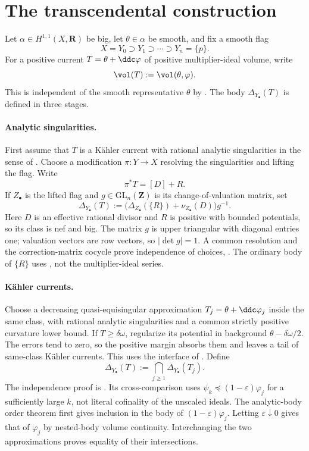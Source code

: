 \section{The transcendental construction}
\label{sec:ok-transcendental-body}

Let $\alpha\in H^{1,1}(X,\mathbf R)$ be big, let
$\theta\in\alpha$ be smooth, and fix a smooth flag
\[
 X=Y_0\supset Y_1\supset\cdots\supset Y_n=\{p\}.
\]
For a positive current $T=\theta+\ddc\varphi$ of positive
multiplier-ideal volume, write
\[
                       \vol(T):=\vol(\theta,\varphi).
\]
This is independent of the smooth representative $\theta$ by
.  The body
$\Delta_{Y_\bullet}(T)$ is defined in three stages.

\paragraph{Analytic singularities.}
First assume that $T$ is a K\"ahler current with rational analytic
singularities in the sense of .
Choose a modification $\pi:Y\to X$ resolving the singularities and lifting
the flag.
Write
\[
                         \pi^*T=[D]+R.
\]
If $Z_\bullet$ is the lifted flag and $g\in\mathrm{GL}_n(\mathbf Z)$
is its change-of-valuation matrix, set
\[
 \Delta_{Y_\bullet}(T)
 :=\bigl(\Delta_{Z_\bullet}(\{R\})+\nu_{Z_\bullet}(D)\bigr)g^{-1}.
\tag{55.7}\label{eq:ok-trans-analytic}
\]
Here $D$ is an effective rational divisor and $R$ is positive with
bounded potentials, so its class is nef and big.
The matrix $g$ is upper triangular with diagonal entries one; valuation
vectors are row vectors, so $|\det g|=1$.
A common resolution and the correction-matrix cocycle prove independence
of choices, \cite[Definition~10.4.2 and Lemma~10.4.1]{XiaBook}.
The ordinary body of $\{R\}$ uses
\cite[Theorem~10.4.1]{XiaBook}, not the multiplier-ideal series.

\paragraph{K\"ahler currents.}
Choose a decreasing quasi-equisingular approximation
$T_j=\theta+\ddc\varphi_j$ inside the same class, with rational analytic
singularities and a common strictly positive curvature lower bound.
If $T\geq\delta\omega$, regularize its potential in background
$\theta-\delta\omega/2$.  The errors tend to zero, so the positive
margin absorbs them and leaves a tail of same-class K\"ahler currents.
This uses the interface of \cite[Theorem~1.6.2]{XiaBook}.
Define
\[
                     \Delta_{Y_\bullet}(T)
                     :=\bigcap_{j\geq1}\Delta_{Y_\bullet}(T_j).
\tag{55.8}\label{eq:ok-trans-kahler}
\]
The independence proof is \cite[Lemma~10.4.4]{XiaBook}.
Its cross-comparison uses $\psi_k\preceq(1-\varepsilon)\varphi_j$
for a sufficiently large $k$, not literal cofinality of the unscaled ideals.
The analytic-body order theorem first gives inclusion in the body of
$(1-\varepsilon)\varphi_j$.  Letting $\varepsilon\downarrow0$ gives
that of $\varphi_j$ by nested-body volume continuity.  Interchanging the
two approximations proves equality of their intersections.

